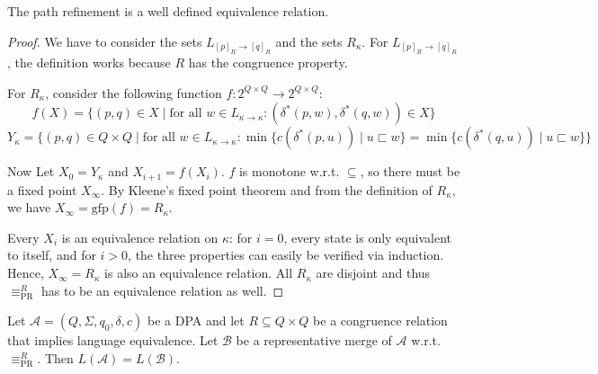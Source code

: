 \begin{lem}
	The path refinement is a well defined equivalence relation.
	\label{lem:pr:pr_well_def}
\end{lem}

\begin{proof}
	We have to consider the sets $L_{[p]_R \rightarrow [q]_R}$ and the sets $R_\kappa$. For $L_{[p]_R \rightarrow [q]_R}$, the definition works because $R$ has the congruence property. 
	
	For $R_\kappa$, consider the following function $f : 2^{Q \times Q} \rightarrow 2^{Q \times Q}$: 
	$$ f(X) = \{ (p, q) \in X \mid \text{for all } w \in L_{\kappa \rightarrow \kappa}: (\delta^*(p, w), \delta^*(q, w)) \in X \}$$
	$$ Y_\kappa = \{ (p, q) \in Q \times Q \mid \text{for all } w \in L_{\kappa \rightarrow \kappa}: \min \{ c(\delta^*(p, u)) \mid u \sqsubset w \} = \min \{ c(\delta^*(q, u)) \mid u \sqsubset w \} \} $$

	Now Let $X_0 = Y_\kappa$ and $X_{i+1} = f(X_i)$. $f$ is monotone w.r.t. $\subseteq$, so there must be a fixed point $X_\infty$. By Kleene's fixed point theorem and from the definition of $R_\kappa$, we have $X_\infty = \text{gfp}(f) = R_\kappa$.
	
	Every $X_i$ is an equivalence relation on $\kappa$: for $i = 0$, every state is only equivalent to itself, and for $i > 0$, the three properties can easily be verified via induction. Hence, $X_\infty = R_\kappa$ is also an equivalence relation. All $R_\kappa$ are disjoint and thus $\equiv_\text{PR}^R$ has to be an equivalence relation as well.
\end{proof}

\begin{theorem}
	Let $\mathcal{A} = (Q, \Sigma, q_0, \delta, c)$ be a DPA and let $R \subseteq Q \times Q$ be a congruence relation that implies language equivalence. Let $\mathcal{B}$ be a representative merge of $\mathcal{A}$ w.r.t. $\equiv_\text{PR}^R$. Then $L(\mathcal{A}) = L(\mathcal{B})$.
\end{theorem}

